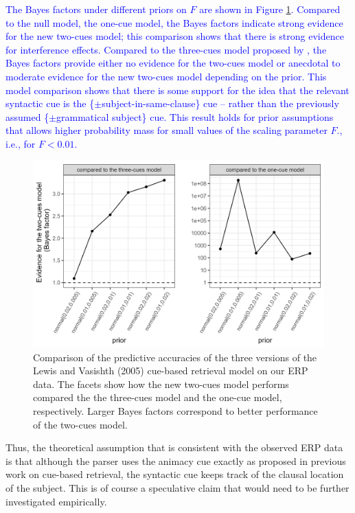 \documentclass[a4paper, man, floatsintext]{apa7}
\begin{document}
{\textcolor{blue}{The Bayes factors under different priors on $F$ are shown in Figure \ref{fig:BF_compmods}. Compared to the null model, the one-cue model, the Bayes factors indicate strong evidence for the new two-cues model; this comparison shows that there is strong evidence for interference effects. Compared to the three-cues model proposed by \textcite{mertzen}, the Bayes factors provide either no evidence for the two-cues model or anecdotal to moderate evidence for the new two-cues model depending on the prior. This model comparison shows that there is some support for the idea that the relevant syntactic cue is the \{$\pm$subject-in-same-clause\} cue – rather than the previously assumed \{$\pm$grammatical subject\} cue. This result holds for prior assumptions that allows higher probability mass for small values of the scaling parameter $F$., i.e., for $F<0.01$.}

\begin{figure}
    \centering
    \caption{Comparison of the predictive accuracies of the three versions of the Lewis and Vasishth (2005) cue-based retrieval model on our ERP data. The facets show how the new two-cues model performs compared the the three-cues model and the one-cue model, respectively. Larger Bayes factors correspond to better performance of the two-cues model.}
    \label{fig:BF_compmods}
    \includegraphics[width=\linewidth]{images/BF_plot_compmodels.png}
\end{figure}

Thus, the theoretical assumption that is consistent with the observed ERP data is that although the parser uses the animacy cue exactly as proposed in previous work on cue-based retrieval, the syntactic cue keeps track of the clausal location of the subject. This is of course a speculative claim that would need to be further investigated empirically. 

}%
\end{document}
